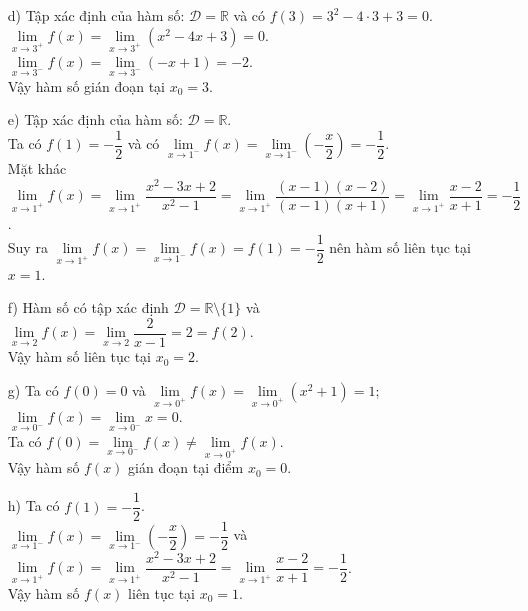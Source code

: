 \begin{ex}
{\begin{enumerate}
			Ta có $f(3)=9$; $\lim\limits_{x  \to 3} f(x)=\lim\limits_{x \to 3} \dfrac{x^2(x-3)}{x-3}=\lim\limits_{x \to 3} x^2=9=f(3)$.\\
			Vậy hàm số liên tục  tại điểm $x_0=3$.
			\item[d)] Tập xác  định của hàm số: $\mathscr{D}=\mathbb{R}$ và có $f(3)=3^2-4\cdot 3+3=0$.\\
			$\lim\limits_{x \to 3^+} f(x)=\lim\limits_{x  \to 3^+} (x^2-4x+3)=0$.\\
			$\lim\limits_{x \to 3^-} f(x)=\lim\limits_{x \to  3^-} (-x+1)=-2$.\\
			Vậy hàm số  gián đoạn tại $x_0=3$.
			\item[e)]  Tập xác định của hàm số: $\mathscr{D}=\mathbb{R}$.\\
			Ta có $f(1)=-\dfrac{1}{2}$ và có $\lim\limits_{x \to 1^-} f(x)=\lim\limits_{x \to 1^-} \left(-\dfrac{x}{2}\right)=-\dfrac{1}{2}$.\\ 
			Mặt khác $\lim\limits_{x \to  1^+} f(x)=\lim\limits_{x \to 1^+} \dfrac{x^2-3x+2}{x^2-1}=\lim\limits_{x \to 1^+} \dfrac{(x-1)(x-2)}{(x-1)(x+1)}=\lim\limits_{x \to 1^+} \dfrac{x-2}{x+1}=-\dfrac{1}{2}$.\\
			Suy ra $\lim\limits_{x \to 1^+}  f(x)=\lim\limits_{x \to 1^-} f(x)=f(1)=-\dfrac{1}{2}$ nên hàm số liên tục tại $x=1$.
			\item[f)] Hàm số có tập xác định  $\mathscr{D}=\mathbb{R} \setminus \{1\}$ và $\lim\limits_{x \to 2} f(x)=\lim\limits_{x \to 2} \dfrac{2}{x-1}=2=f(2)$.\\
			Vậy hàm số liên tục  tại $x_0=2$.
			\item[g)] Ta có $f(0)=0$ và $\lim\limits_{x \to 0^+} f(x)=\lim\limits_{x \to 0^+} (x^2+1)=1$; $\lim\limits_{x \to 0^-} f(x)=\lim\limits_{x \to 0^-} x=0$.\\ 
			Ta có $f(0)=\lim\limits_{x \to 0^-}  f(x) \neq \lim\limits_{x \to 0^+} f(x)$.\\
			Vậy hàm  số $f(x)$ gián đoạn tại điểm $x_0=0$.
			 \item[h)] Ta có $f(1)=-\dfrac{1}{2}$.\\
			 $\lim\limits_{x \to 1^-} f(x)=\lim\limits_{x \to 1^-} \left(-\dfrac{x}{2}\right)=-\dfrac{1}{2}$ và $\lim\limits_{x \to 1^+} f(x)=\lim\limits_{x \to 1^+} \dfrac{x^2-3x+2}{x^2-1}=\lim\limits_{x \to 1^+} \dfrac{x-2}{x+1}=-\dfrac{1}{2}$.\\
			Vậy hàm số  $f(x)$ liên tục tại $x_0=1$.
		\end{enumerate}
	} 
\end{ex}

